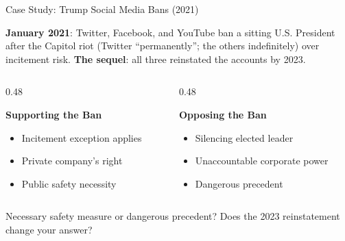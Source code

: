 ﻿\documentclass[aspectratio=169,11pt]{beamer}
\begin{document}
\begin{frame}[shrink=8]{Case Study: Trump Social Media Bans (2021)}
\begin{casestudybox}
\textbf{January 2021}: Twitter, Facebook, and YouTube ban a sitting U.S. President after the Capitol riot (Twitter ``permanently''; the others indefinitely) over incitement risk. \textbf{The sequel}: all three reinstated the accounts by 2023.
\end{casestudybox}

\vspace{0.1cm}
\begin{columns}[T]
\begin{column}{0.48\textwidth}
\begin{block}{\textbf{Supporting the Ban}}
\begin{itemize}
    \item Incitement exception applies
    \item Private company's right
    \item Public safety necessity
\end{itemize}
\end{block}
\end{column}

\begin{column}{0.48\textwidth}
\begin{block}{\textbf{Opposing the Ban}}
\begin{itemize}
    \item Silencing elected leader
    \item Unaccountable corporate power
    \item Dangerous precedent
\end{itemize}
\end{block}
\end{column}
\end{columns}

\begin{discussionbox}[Discussion]
Necessary safety measure or dangerous precedent? Does the 2023 reinstatement change your answer?
\end{discussionbox}
\end{frame}
\end{document}
